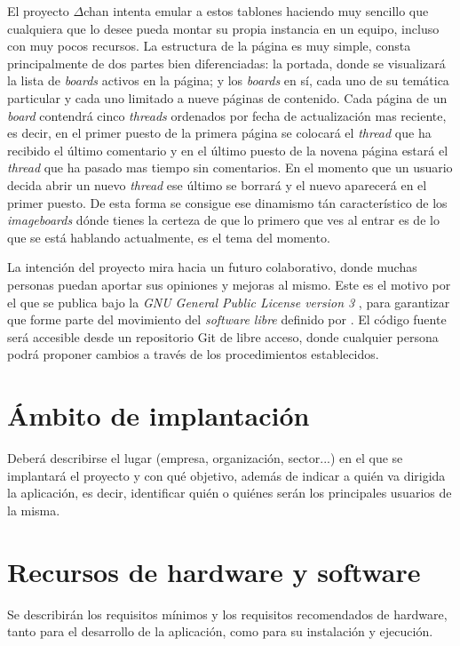 \documentclass[12pt,a4paper,titlepage]{article}
\newcommand\Dchan{$\Delta$chan }
\begin{document}
    El proyecto \Dchan intenta emular a estos tablones haciendo muy sencillo que cualquiera que lo desee pueda montar su propia instancia en un equipo, incluso con muy pocos recursos. La estructura de la página es muy simple, consta principalmente de dos partes bien diferenciadas: la portada, donde se visualizará la lista de \textit{boards} activos en la página; y los \textit{boards} en sí, cada uno de su temática particular y cada uno limitado a nueve páginas de contenido. Cada página de un \textit{board} contendrá cinco \textit{threads} ordenados por fecha de actualización mas reciente, es decir, en el primer puesto de la primera página se colocará el \textit{thread} que ha recibido el último comentario y en el último puesto de la novena página estará el \textit{thread} que ha pasado mas tiempo sin comentarios. En el momento que un usuario decida abrir un nuevo \textit{thread} ese último se borrará y el nuevo aparecerá en el primer puesto. De esta forma se consigue ese dinamismo tán característico de los \textit{imageboards} dónde tienes la certeza de que lo primero que ves al entrar es de lo que se está hablando actualmente, es el tema del momento.

    La intención del proyecto mira hacia un futuro colaborativo, donde muchas personas puedan aportar sus opiniones y mejoras al mismo. Este es el motivo por el que se publica bajo la \emph{GNU General Public License version 3} \cite{gnugplv3}, para garantizar que forme parte del movimiento del \emph{software libre} definido por \textcite{libresoftwaredefinition}. El código fuente será accesible desde un repositorio Git de libre acceso, donde cualquier persona podrá proponer cambios a través de los procedimientos establecidos.

    \section{Ámbito de implantación}

    Deberá describirse el lugar (empresa, organización, sector...) en el que se implantará el proyecto y con qué objetivo, además de indicar a quién va dirigida la aplicación, es decir, identificar quién o quiénes serán los principales usuarios de la misma.

    \section{Recursos de hardware y software}

    Se describirán los requisitos mínimos y los requisitos recomendados de hardware, tanto para el desarrollo de la aplicación, como para su instalación y ejecución.
\end{document}
